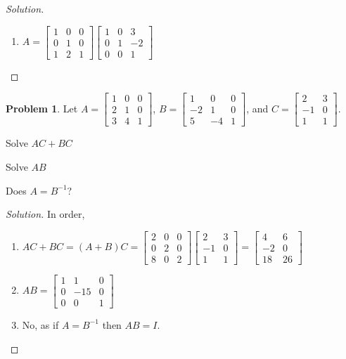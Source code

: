 \documentclass[oneside]{book}
\theoremstyle{definition}
\newtheorem{problem}{Problem}[section]
\begin{document}
\begin{proof}[Solution]
\begin{enumerate}
\item $A = \begin{bmatrix} 1 & 0 & 0 \\ 0 & 1 & 0 \\ 1 & 2 & 1 \end{bmatrix} \begin{bmatrix} 1 & 0 & 3 \\ 0 & 1 & -2 \\ 0 & 0 & 1 \end{bmatrix}$
\end{enumerate}
\end{proof} 

\begin{problem}
Let $A = \begin{bmatrix} 1 & 0 & 0 \\ 2 & 1 & 0 \\ 3 & 4 & 1 \end{bmatrix}$, $B=\begin{bmatrix}1 & 0 & 0 \\ -2 & 1 & 0 \\ 5 & -4 & 1 \end{bmatrix}$, and $C = \begin{bmatrix} 2 & 3 \\ -1 & 0 \\ 1 & 1 \end{bmatrix}$. 
\begin{enumerate}
\begin{multicols}{3}
\item Solve $AC+BC$
\item Solve $AB$
\item Does $A = B^{-1}$?
\end{multicols}
\end{enumerate}
\end{problem}
\begin{proof}[Solution]
In order,
\begin{enumerate}
\item $AC+BC = (A+B)C = \begin{bmatrix} 2 & 0 & 0 \\ 0 & 2 & 0 \\ 8 & 0 & 2 \end{bmatrix} \begin{bmatrix} 2 & 3 \\ -1 & 0 \\ 1 & 1 \end{bmatrix} = \begin{bmatrix} 4 & 6 \\ -2 & 0 \\ 18 & 26 \end{bmatrix}$
\item $AB = \begin{bmatrix} 1 & 1 & 0 \\ 0 & -15 & 0 \\ 0 & 0 & 1 \end{bmatrix}$
\item No, as if $A=B^{-1}$ then $AB=I$.
\end{enumerate}
\end{proof}
\end{document}
